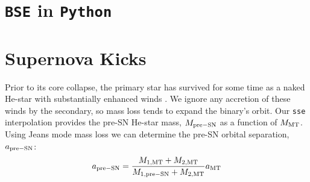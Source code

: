 \documentclass[usenatbib]{mnras}
\begin{document}
\section{{\tt BSE} in {\tt Python}} \label{sec:pyBSE}





\section{Supernova Kicks} \label{sec:trans_SN}

Prior to its core collapse, the primary star has survived for some time as a naked He-star with substantially enhanced winds \cite{belczynski10}. We ignore any accretion of these winds by the secondary, so mass loss tends to expand the binary's orbit. Our {\tt sse} interpolation provides the pre-SN He-star mass, $M_{\rm pre-SN}$ as a function of $M_{\rm MT}$. Using Jeans mode mass loss we can determine the pre-SN orbital separation, $a_{\rm pre-SN}$:
\begin{equation}
a_{\rm pre-SN} = \frac{M_{\rm 1, MT} + M_{\rm 2, MT}}{M_{\rm 1, pre-SN} + M_{\rm 2, MT}} a_{\rm MT}
\end{equation}
\end{document}
